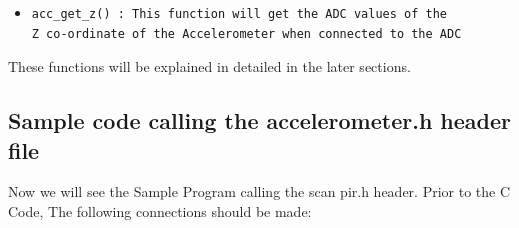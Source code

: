 \documentclass[a4paper,12 pt]{article}
\begin{document}
\begin{itemize}
\item	\begin{verbatim}
acc_get_z() : This function will get the ADC values of the 
Z co-ordinate of the Accelerometer when connected to the ADC
\end{verbatim}
\end{itemize}




These functions will be explained in detailed in the later sections.

\subsection{Sample code calling the accelerometer.h header file}
Now we will see the Sample Program calling the scan pir.h header. Prior to the C Code, The following
connections should be made:
\end{document}
